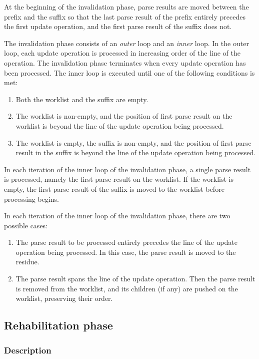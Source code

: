 At the beginning of the invalidation phase, parse results are moved
between the prefix and the suffix so that the last parse result of the
prefix entirely precedes the first update operation, and the first
parse result of the suffix does not.

The invalidation phase consists of an \emph{outer} loop and an
\emph{inner} loop.  In the outer loop, each update operation is
processed in increasing order of the line of the operation.  The
invalidation phase terminates when every update operation has been
processed.  The inner loop is executed until one of the following
conditions is met:

\begin{enumerate}
\item Both the worklist and the suffix are empty.
\item The worklist is non-empty, and the position of first parse
  result on the worklist is beyond the line of the update operation
  being processed.
\item The worklist is empty, the suffix is non-empty, and the position
  of first parse result in the suffix is beyond the line of the update
  operation being processed.
\end{enumerate}

In each iteration of the inner loop of the invalidation phase, a
single parse result is processed, namely the first parse result on the
worklist.  If the worklist is empty, the first parse result of the
suffix is moved to the worklist before processing begins.

In each iteration of the inner loop of the invalidation phase, there
are two possible cases:

\begin{enumerate}
\item The parse result to be processed entirely precedes the line of
  the update operation being processed.  In this case, the parse
  result is moved to the residue.
\item The parse result spans the line of the update operation.  Then
  the parse result is removed from the worklist, and its children (if
  any) are pushed on the worklist, preserving their order.
\end{enumerate}

\subsection{Rehabilitation phase}

\subsubsection{Description}

